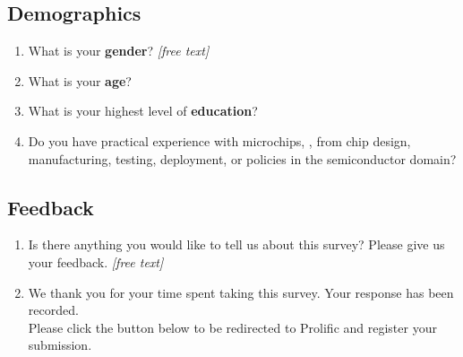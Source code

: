 \subsection{Demographics}
\label{xhw_study::subapp::demographics}
\begin{enumerate}
    \setcounter{enumi}{\value{qcounter}}
    \item \label{xhw_study::question::gender}
        What is your \textbf{gender}?
             \textit{[free text]}
    \item \label{xhw_study::question::age}
        What is your \textbf{age}?
    \item \label{xhw_study::question::education}
        What is your highest level of \textbf{education}?
    \item \label{xhw_study::question::experience}
        Do you have practical experience with microchips, \eg, from chip design, manufacturing, testing, deployment, or policies in the semiconductor domain?

    \setcounter{qcounter}{\value{enumi}}
\end{enumerate}

\subsection{Feedback}
\label{xhw_study::subapp::feedback}
\begin{enumerate}
    \setcounter{enumi}{\value{qcounter}}
    \item \label{xhw_study::question::feedback}
        Is there anything you would like to tell us about this survey? Please give us your feedback.  \textit{[free text]}
    \item \label{xhw_study::question::outro}
        We thank you for your time spent taking this survey. Your response has been recorded.\\
        Please click the button below to be redirected to Prolific and register your submission.
    \setcounter{qcounter}{\value{enumi}}
\end{enumerate}

